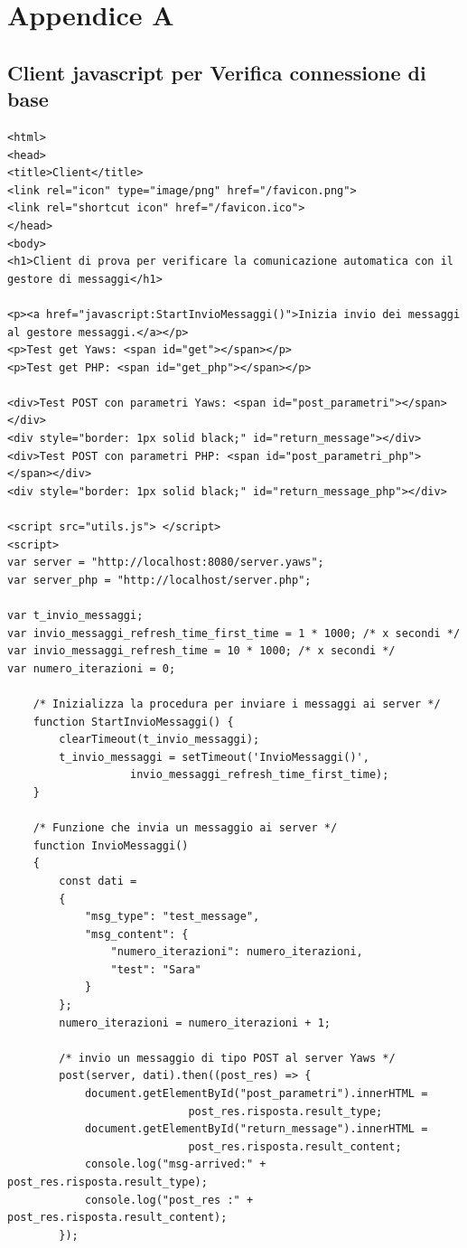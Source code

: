 \chapter{Appendice A}


\section{Client javascript per Verifica connessione di base}
\label{javascript_verifica_base_src}
\begin{verbatim}
<html>
<head>
<title>Client</title>
<link rel="icon" type="image/png" href="/favicon.png"> 
<link rel="shortcut icon" href="/favicon.ico">
</head>
<body>
<h1>Client di prova per verificare la comunicazione automatica con il 
gestore di messaggi</h1>

<p><a href="javascript:StartInvioMessaggi()">Inizia invio dei messaggi 
al gestore messaggi.</a></p>
<p>Test get Yaws: <span id="get"></span></p>
<p>Test get PHP: <span id="get_php"></span></p>

<div>Test POST con parametri Yaws: <span id="post_parametri"></span></div>
<div style="border: 1px solid black;" id="return_message"></div>
<div>Test POST con parametri PHP: <span id="post_parametri_php"></span></div>
<div style="border: 1px solid black;" id="return_message_php"></div>

<script src="utils.js">	</script>
<script>		
var server = "http://localhost:8080/server.yaws";
var server_php = "http://localhost/server.php";

var t_invio_messaggi;
var invio_messaggi_refresh_time_first_time = 1 * 1000; /* x secondi */
var invio_messaggi_refresh_time = 10 * 1000; /* x secondi */
var numero_iterazioni = 0;

	/* Inizializza la procedura per inviare i messaggi ai server */
	function StartInvioMessaggi() {
		clearTimeout(t_invio_messaggi);
		t_invio_messaggi = setTimeout('InvioMessaggi()',
		           invio_messaggi_refresh_time_first_time); 
	}

	/* Funzione che invia un messaggio ai server */
	function InvioMessaggi()
	{
		const dati = 
		{ 
			"msg_type": "test_message", 
			"msg_content": {
				"numero_iterazioni": numero_iterazioni, 
				"test": "Sara" 
			}
		};
		numero_iterazioni = numero_iterazioni + 1;
		
		/* invio un messaggio di tipo POST al server Yaws */	
		post(server, dati).then((post_res) => {
			document.getElementById("post_parametri").innerHTML =
							post_res.risposta.result_type;
			document.getElementById("return_message").innerHTML = 
							post_res.risposta.result_content;
			console.log("msg-arrived:" + post_res.risposta.result_type);
			console.log("post_res :" + post_res.risposta.result_content);
		});
		

\end{verbatim}
